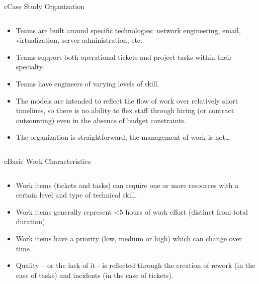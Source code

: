 \begin{myslide}{c}{Case Study Organization}

\begin{columns}

\begin{column}{1\textwidth}

\begin{itemize}

\item Teams are built around specific technologies: network engineering, email, virtualization, server administration, etc.

\item Teams support both operational tickets and project tasks within their specialty.

\item Teams have engineers of varying levels of skill.

\item The models are intended to reflect the flow of work over relatively short timelines, so there is no ability to flex staff through hiring (or contract outsourcing) even in the absence of budget constraints.

\item The organization is straightforward, the management of work is not…

\end{itemize}

\end{column}

\end{columns}

\end{myslide}

\begin{myslide}{c}{Basic Work Characteristics}

\begin{columns}

\begin{column}{1\textwidth}

\begin{itemize}

\item Work items (tickets and tasks) can require one or more resources with a certain level and type of technical skill.

\item Work items generally represent <5 hours of work effort (distinct from total duration).

\item Work items have a priority (low, medium or high) which can change over time.

\item Quality – or the lack of it - is reflected through the creation of rework (in the case of tasks) and incidents (in the case of tickets).

\end{itemize}

\end{column}

\end{columns}

\end{myslide}
